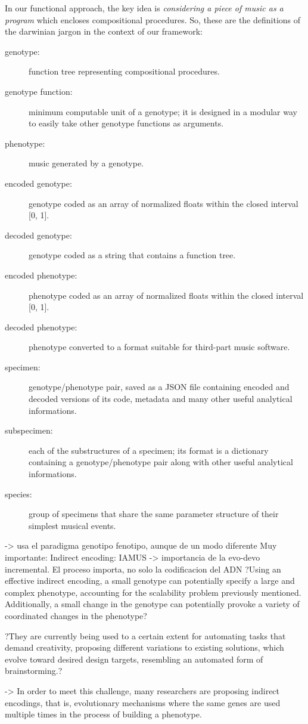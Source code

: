 \documentclass{article}
\begin{document}
In our functional approach, the key idea is \emph{considering a piece of music as a program} which encloses compositional procedures. So, these are the definitions of the darwinian jargon in the context of our framework: 


\begin{description}
\item[genotype:] function tree representing compositional procedures.
\item[genotype function:] minimum computable unit of a genotype; it is designed in a modular way to easily take other genotype functions as arguments.
\item[phenotype:] music generated by a genotype.
\item[encoded genotype:] genotype coded as an array of normalized floats within the closed interval [0, 1].
\item[decoded genotype:] genotype coded as a string that contains a function tree.
\item[encoded phenotype:] phenotype coded as an array of normalized floats within the closed interval [0, 1].
\item[decoded phenotype:] phenotype converted to a format suitable for third-part music software.
\item[specimen:] genotype/phenotype pair, saved as a JSON file containing encoded and decoded versions of its code, metadata and many other useful analytical informations.
\item[subspecimen:] each of the substructures of a specimen; its format is a dictionary containing a genotype/phenotype pair along with other useful analytical informations.
\item[species:] group of specimens that share the same parameter structure of their simplest musical events.
\end{description}


{\color{red}




 -> usa el paradigma genotipo fenotipo, aunque de un modo diferente
Muy importante: Indirect encoding: IAMUS -> importancia de la evo-devo incremental. El proceso importa, no solo la codificacion del ADN
?Using an effective indirect encoding, a small
genotype can potentially specify a large and complex
phenotype, accounting for the scalability problem
previously mentioned. Additionally, a small change
in the genotype can potentially provoke a variety of
coordinated changes in the phenotype?

?They are currently
being used to a certain extent for automating
tasks that demand creativity, proposing different
variations to existing solutions, which evolve toward
desired design targets, resembling an automated form
of brainstorming.?


\cite{stanley:alife03} -> In order to meet this
challenge, many researchers are proposing indirect
encodings, that is, evolutionary mechanisms where the same
genes are used multiple times in the process of building a
phenotype.

}
\end{document}

